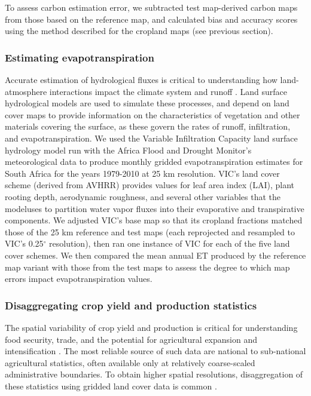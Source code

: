 \documentclass[a4paper]{article}
\begin{document}
To assess carbon estimation error, we subtracted test map-derived carbon maps from those based on the reference map, and calculated bias and accuracy scores using the method described for the cropland maps (see previous section). 

\vspace{-0.3 cm}
\subsubsection*{Estimating evapotranspiration}
\vspace{-0.2 cm}
Accurate estimation of hydrological fluxes is critical to understanding how land-atmosphere interactions impact the climate system and runoff \citep{liang_simple_1994}. Land surface hydrological models are used to simulate these processes, and depend on land cover maps to provide information on the characteristics of vegetation and other materials covering the surface, as these govern the rates of runoff, infiltration, and evapotranspiration. We used the Variable Infiltration Capacity \citep[VIC;][]{liang_simple_1994} land surface hydrology model run with the Africa Flood and Drought Monitor's meteorological data \citep{sheffield_drought_2013} to produce monthly gridded evapotranspiration estimates for South Africa for the years 1979-2010 at 25 km resolution. VIC's land cover scheme (derived from AVHRR) provides values for leaf area index (LAI), plant rooting depth, aerodynamic roughness, and several other variables that the modeluses to partition water vapor fluxes into their evaporative and transpirative components. We adjusted VIC's base map so that its cropland fractions matched those of the 25 km reference and test maps (each reprojected and resampled to VIC's 0.25$^{\circ}$ resolution), then ran one instance of VIC for each of the five land cover schemes. We then compared the mean annual ET produced by the reference map variant with those from the test maps to assess the degree to which map errors impact evapotranspiration values. 

\vspace{-0.3 cm}
\subsubsection*{Disaggregating crop yield and production statistics}
\vspace{-0.2 cm}
The spatial variability of crop yield and production is critical for understanding food security, trade, and the potential for agricultural expansion and intensification \citep{licker_mind_2010,monfreda_farming_2008}. The most reliable source of such data are national to sub-national agricultural statistics, often available only at relatively coarse-scaled administrative boundaries. To obtain higher spatial resolutions, disaggregation of these statistics using gridded land cover data is common \citep{ramankutty_farming_2008, monfreda_farming_2008,schierhorn_post-soviet_2013}. 
\end{document}
